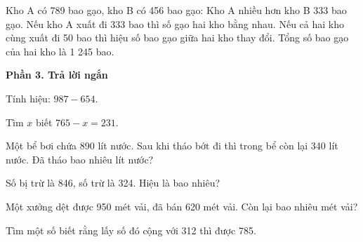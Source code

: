 \begin{ex} %
Kho A có 789 bao gạo, kho B có 456 bao gạo:
\choiceTF
{\True Kho A nhiều hơn kho B 333 bao gạo.}
{Nếu kho A xuất đi 333 bao thì số gạo hai kho bằng nhau.}
{Nếu cả hai kho cùng xuất đi 50 bao thì hiệu số bao gạo giữa hai kho thay đổi.}
{\True Tổng số bao gạo của hai kho là 1 245 bao.}
\end{ex}

\textbf{Phần 3. Trả lời ngắn}

\begin{ex} %
Tính hiệu: $987 - 654$.
\end{ex}

\begin{ex} %
Tìm $x$ biết $765 - x = 231$.
\end{ex}

\begin{ex} %
Một bể bơi chứa 890 lít nước. Sau khi tháo bớt đi thì trong bể còn lại 340 lít nước. Đã tháo bao nhiêu lít nước?
\end{ex}

\begin{ex} %
Số bị trừ là 846, số trừ là 324. Hiệu là bao nhiêu?
\end{ex}

\begin{ex} %
Một xưởng dệt được 950 mét vải, đã bán 620 mét vải. Còn lại bao nhiêu mét vải?
\end{ex}

\begin{ex} %
Tìm một số biết rằng lấy số đó cộng với 312 thì được 785.
\end{ex}
